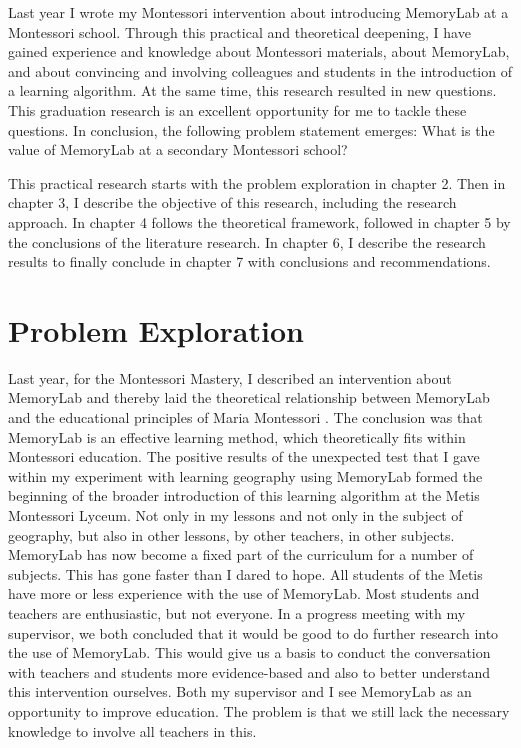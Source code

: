 \documentclass[12pt, a4paper]{article}
\begin{document}
Last year I wrote my Montessori intervention about introducing MemoryLab at a Montessori school. \cite[]{Marijn23} Through this practical and theoretical deepening, I have gained experience and knowledge about Montessori materials, about MemoryLab, and about convincing and involving colleagues and students in the introduction of a learning algorithm. At the same time, this research resulted in new questions. This graduation research is an excellent opportunity for me to tackle these questions. In conclusion, the following problem statement emerges: What is the value of MemoryLab at a secondary Montessori school?\

This practical research starts with the problem exploration in chapter 2. Then in chapter 3, I describe the objective of this research, including the research approach. In chapter 4 follows the theoretical framework, followed in chapter 5 by the conclusions of the literature research. In chapter 6, I describe the research results to finally conclude in chapter 7 with conclusions and recommendations. 
\newpage 

\section{Problem Exploration} Last year, for the Montessori Mastery, I described an intervention about MemoryLab and thereby laid the theoretical relationship between MemoryLab and the educational principles of Maria Montessori \cite[]{Marijn23}. The conclusion was that MemoryLab is an effective learning method, which theoretically fits within Montessori education. The positive results of the unexpected test that I gave within my experiment with learning geography using MemoryLab formed the beginning of the broader introduction of this learning algorithm at the Metis Montessori Lyceum. Not only in my lessons and not only in the subject of geography, but also in other lessons, by other teachers, in other subjects. MemoryLab has now become a fixed part of the curriculum for a number of subjects. This has gone faster than I dared to hope. All students of the Metis have more or less experience with the use of MemoryLab. Most students and teachers are enthusiastic, but not everyone. In a progress meeting with my supervisor, we both concluded that it would be good to do further research into the use of MemoryLab. This would give us a basis to conduct the conversation with teachers and students more evidence-based and also to better understand this intervention ourselves. Both my supervisor and I see MemoryLab as an opportunity to improve education. The problem is that we still lack the necessary knowledge to involve all teachers in this.
\end{document}
